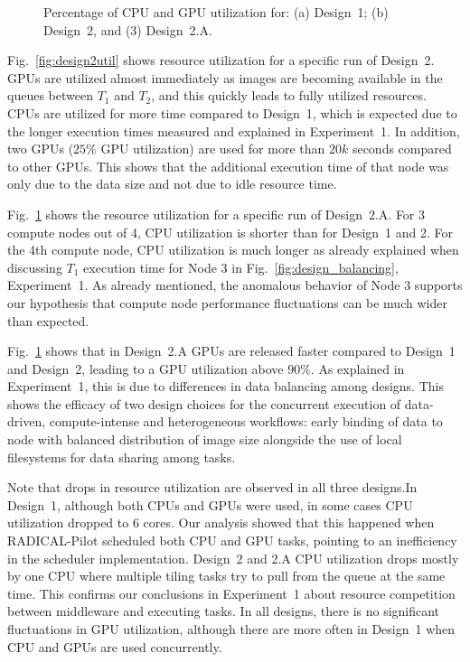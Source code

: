 \begin{figure}[H]
\begin{subfigure}[b]{0.65\textwidth}
        \caption{}
        \label{fig:design2autil}
    \end{subfigure}
    \caption{Percentage of CPU and GPU utilization for: (a) Design~1; (b) 
    Design~2, and (3) Design~2.A.}
    \label{fig:Utilization}
\end{figure}


Fig.~\ref{fig:design2util} shows resource utilization for a specific run of 
Design~2. GPUs are utilized almost immediately as images are becoming 
available in the queues between $T_{1}$ and $T_{2}$, and this quickly leads to 
fully utilized resources. CPUs are utilized for more time compared to 
Design~1, which is expected due to the longer execution times measured and 
explained in Experiment~1. In addition, two GPUs ($25\%$ GPU utilization) are 
used for more than $20k$ seconds compared to other GPUs. This shows that the 
additional execution time of that node was only due to the data size and not 
due to idle resource time.

Fig.~\ref{fig:design2autil} shows the resource utilization for a specific run 
of Design~2.A. For 3 compute nodes out of 4, CPU utilization is shorter than 
for Design~1 and 2. For the 4th compute node, CPU utilization is much longer 
as already explained when discussing $T_{1}$ execution time for Node 3 in 
Fig.~\ref{fig:design_balancing}, Experiment~1. As already mentioned, the 
anomalous behavior of Node 3 supports our hypothesis that compute node 
performance fluctuations can be much wider than expected.

Fig.~\ref{fig:design2autil} shows that in Design~2.A GPUs are released faster 
compared to Design~1 and Design~2, leading to a GPU utilization above $90\%$.
As explained in Experiment~1, this is due to differences in data balancing 
among designs. This shows the efficacy of two design choices for the 
concurrent execution of data-driven, compute-intense and heterogeneous 
workflows: early binding of data to node with balanced distribution of image 
size alongside the use of local filesystems for data sharing among tasks.

Note that drops in resource utilization are observed in all three designs.In 
Design~1, although both CPUs and GPUs were used, in some cases CPU utilization 
dropped to 6 cores. Our analysis showed that this happened when RADICAL-Pilot 
scheduled both CPU and GPU tasks, pointing to an inefficiency in the scheduler 
implementation. Design~2 and 2.A CPU utilization drops mostly by one CPU where 
multiple tiling tasks try to pull from the queue at the same time. This 
confirms our conclusions in Experiment~1 about resource competition between 
middleware and executing tasks. In all designs, there is no significant 
fluctuations in GPU utilization, although there are more often in Design~1 
when CPU and GPUs are used concurrently.


